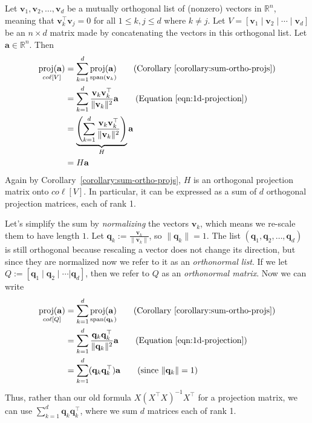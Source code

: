 \documentclass[12pt, a4paper]{article}
\theoremstyle{definition}
\begin{document}
	Let $\mathbf{v}_1,\mathbf{v}_2,\ldots,\mathbf{v}_d$ be a mutually orthogonal list
	of (nonzero) vectors in $\mathbb{R}^n$, meaning that $\mathbf{v}_k^\top\mathbf{v}_j=0$
	for all $1\leq k,j\leq d$ where $k\neq j$. Let
	$V=[\mathbf{v}_1 \mid \mathbf{v}_2 \mid \cdots\mid \mathbf{v}_d]$
	be an $n\times d$ matrix made by concatenating the vectors in this orthogonal list.
	Let $\mathbf{a}\in\mathbb{R}^n$. Then
	\begin{align*}
		\underset{co\ell [V]}{\text{proj}(\mathbf{a})}
		&= \sum_{k=1}^{d}\underset{\text{span}(\mathbf{v}_k)}{\text{proj}(\mathbf{a})}
		\tag{Corollary~\ref{corollary:sum-ortho-projs}}\\
		&=\sum_{k=1}^{d}\frac{\mathbf{v}_k\mathbf{v}_k^\top}{\|\mathbf{v}_k\|^2}\mathbf{a}
		\tag{Equation~\ref{eqn:1d-projection}}\\
		&=\underbrace{\left(\sum_{k=1}^{d}\frac{\mathbf{v}_k\mathbf{v}_k^\top}{\|\mathbf{v}_k\|^2}\right)}_{H}
		\mathbf{a}\\
		&=H\mathbf{a}
	\end{align*}
	Again by Corollary~\ref{corollary:sum-ortho-projs}, $H$ is an orthogonal projection
	matrix onto $co\ell[V]$. In particular, it can be expressed as a sum of $d$ orthogonal
	projection matrices, each of rank 1.
	
	Let's simplify the sum by \textit{normalizing} the vectors $\mathbf{v}_k$, which means we re-scale them
	to have length $1$. Let $\mathbf{q}_k := \frac{\mathbf{v}_k}{\|\mathbf{v}_k\|}$,
	so $\|\mathbf{q}_k\|=1$. The list $(\mathbf{q}_1,\mathbf{q}_2,\ldots,\mathbf{q}_d)$
	is still orthogonal because rescaling a vector does not change its direction,
	but since they are normalized now we refer to it as an \textit{orthonormal list}.
	If we let $Q:=[\mathbf{q}_1 \mid \mathbf{q}_2\mid \cdots |\mathbf{q}_d]$, then
	we refer to $Q$ as an \textit{orthonormal matrix}. Now we can write
	\begin{align*}
		\underset{co\ell [Q]}{\text{proj}(\mathbf{a})}
		&= \sum_{k=1}^{d}\underset{\text{span}(\mathbf{q}_k)}{\text{proj}(\mathbf{a})}
		\tag{Corollary~\ref{corollary:sum-ortho-projs}}\\
		&=\sum_{k=1}^{d}\frac{\mathbf{q}_k\mathbf{q}_k^\top}{\|\mathbf{q}_k\|^2}\mathbf{a}
		\tag{Equation~\ref{eqn:1d-projection}}\\
		&=\sum_{k=1}^{d}(\mathbf{q}_k\mathbf{q}_k^\top)\mathbf{a}
		\tag{since $\|\mathbf{q}_k\|=1$}\\
	\end{align*}
	Thus, rather than our old formula $X(X^\top X)^{-1}X^\top$ for a projection matrix, we can
	use $\sum_{k=1}^{d}\mathbf{q}_k\mathbf{q}_k^\top$, where we sum $d$ matrices each of rank 1.
\end{document}

